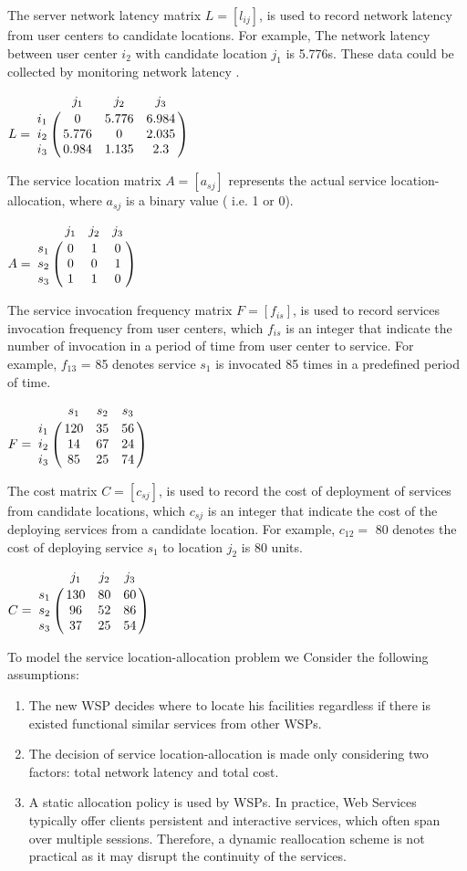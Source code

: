 \documentclass{llncs}
\let\bbordermatrix\bordermatrix
\begin{document}
The server network latency matrix $L = [l_{ij}]$, is used to record network latency from user centers to 
candidate locations. For example, The network latency between user center $i_{2}$ with candidate location $j_{1}$ 
is 5.776s. These data could be collected by monitoring network latency \cite{6076756} \cite{5552800}.
\begin{center}
$
L = \bbordermatrix{~ & j_{1} & j_{2} & j_{3} \cr
					i_{1}	&0 &5.776 &6.984	\cr
					i_{2}	&5.776  &0 &2.035 \cr
					i_{3}	&0.984 &1.135	&2.3 \cr}
$
\end{center}
The service location matrix $A = [a_{sj}]$ represents the actual service location-allocation, where $a_{sj}$  is a binary value ( i.e. 1 or 0).
\begin{center}
$
A = \bbordermatrix{~ & j_{1} & j_{2} & j_{3}\cr
					s_{1}	&0 &1 &0	\cr
					s_{2}	&0  &0 &1	\cr
					s_{3}	&1 &1 &0	\cr}
$
\end{center}

The service invocation frequency matrix $F= [f_{is}]$, is used to record services invocation frequency from user centers, 
which $f_{is}$ is an integer that indicate the number of invocation in a period of time from user center to service. 
For example, $f_{13}$ = 85 denotes service $s_{1}$ is invocated 85 times in a predefined period of time.
\begin{center}
$
F = \bbordermatrix{~ & s_{1} & s_{2} & s_{3}  \cr
					i_{1}	&120 &35 &56	\cr
					i_{2}	&14  &67 &24 \cr
					i_{3}	&85 &25 &74 \cr}
$
\end{center}

The cost matrix $C = [c_{sj}]$, is used to record the cost of deployment of services from candidate locations, 
which $c_{sj}$ is an integer that indicate the cost of the deploying services from a candidate location. 
For example, $c_{12} = $ 80 denotes the cost of deploying service $s_{1}$ to location $j_{2}$ is 80 units.
\begin{center}
$
C = \bbordermatrix{~ & j_{1} & j_{2} & j_{3}\cr
					s_{1}	&130 &80 &60\cr
					s_{2}	&96  &52 &86\cr
					s_{3}	&37 &25 &54\cr}
$
\end{center}

To model the service location-allocation problem we Consider the following assumptions:
\begin{enumerate}
	\item The new WSP decides where to locate his facilities regardless if there is existed functional similar services from other WSPs.
	\item The decision of service location-allocation is made only considering two factors: total network latency and total cost.
	\item A static allocation policy is used by WSPs. In practice, Web Services typically offer clients persistent and interactive services, which often span over multiple sessions. Therefore, a dynamic reallocation scheme is not practical as it may disrupt the continuity of the services.
\end{enumerate}
\end{document}
